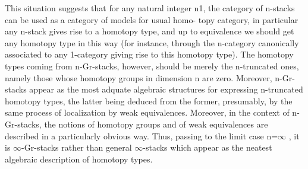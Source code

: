 This situation suggests that for any natural integer n\hand{$\geq$}1, the
category of n-stacks can be used as a category of models for  usual homo-%
topy category, in particular any n-stack gives rise to a homotopy type,
 and up to equivalence we should get any homotopy type in this
way (for instance, through the n-category canonically associated to
any 1-category giving rise to this homotopy type). The homotopy types
coming from n-Gr-stacks, however, should be merely the n-truncated
ones, namely those whose homotopy groups in dimension \hand{$>$} n are zero.
 Moreover,  n-Gr-stacks appear as  the most adquate 
algebraic structures for expressing n-truncated homotopy types, the
latter being deduced from the former, presumably, by the same process
of localization by weak equivalences. Moreover, in the context of
n-Gr-stacks, the notions of homotopy groups and of weak equivalences
are described in a particularly obvious way. Thus, passing to the
limit case n=$\infty$ , it is $\infty$-Gr-stacks rather than general $\infty$-stacks
which appear as the neatest algebraic description of homotopy types.
